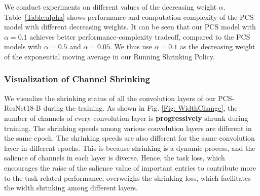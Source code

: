 \documentclass[lettersize,journal]{IEEEtran}
\begin{document}
We conduct experiments on different values of the decreasing weight $\alpha$. Table~\ref{Table:alpha} shows  performance and computation complexity of the PCS model with different decreasing weights. It can be seen that our PCS model with $\alpha = 0.1$ achieves better performance-complexity tradeoff, compared to the PCS models with $\alpha = 0.5$ and $\alpha = 0.05$. We thus use $\alpha = 0.1$ as the decreasing weight of the exponential moving average in our Running Shrinking Policy.

\begin{table}[t]
\setlength{\tabcolsep}{0.8mm}
  \begin{center}
     \caption{Comparison of different exponential moving average rate $\alpha$ for our Running Shrinking Policy. 
     The latency is measured on NVIDIA GTX 1080Ti with batch size 32. $\uparrow$ and $\downarrow$ denote increasing and decreasing, respectively.  
     }
     \label{Table:alpha}
  \end{center}
\vspace{-5mm}
\end{table}


\subsubsection{Visualization of Channel Shrinking}
\label{Channel Shrinking}
We visualize the shrinking status of all the convolution layers of our PCS-ResNet18-B during the training. 
As shown in Fig. \ref{Fig: WidthChange}, the number of channels of every convolution layer is \textbf{progressively} shrunk during training. 
The shrinking speeds among various convolution layers are different in the same epoch. The shrinking speeds are also different for the same convolution layer in different epochs. This is because shrinking is a dynamic process, and the salience of channels in each layer is diverse. Hence, the task loss, which encourages the raise of the salience value of important entries to contribute more to the task-related performance, overweighs the shrinking loss, which facilitates the width shrinking among different layers. 
\end{document}
